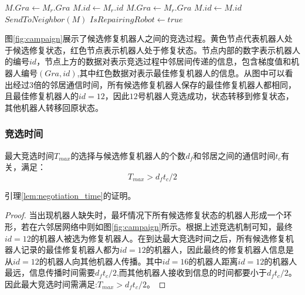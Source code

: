 \begin{algorithm}
	\begin{algorithmic}[1]
					\State $M.Gra \gets M_r.Gra$
					\State $M.id \gets M_r.id$	
				\Else 
						\State $M.Gra \gets M_r.Gra$
						\State $M.id \gets M.id$
					\EndIf
				\EndIf
				\State $SendToNeighbor(M)$
			\Else 
					\State $IsRepairingRobot \gets true$
					\State {} 
				\EndIf	
			\EndIf			
		\EndFunction		
	\end{algorithmic}
\end{algorithm}

图\ref{fig:campaign}展示了候选修复机器人之间的竞选过程。黄色节点代表机器人处于候选修复状态，红色节点表示机器人处于修复状态。节点内部的数字表示机器人的编号$id$，节点上方的数据对表示竞选过程中邻居间传递的信息，包含梯度值和机器人编号$(Gra,id)$,其中红色数据对表示最佳修复机器人的信息。从图中可以看出经过3倍的邻居通信时间，所有候选修复机器人保存的最佳修复机器人都相同，且最佳修复机器人的$id = 12$，因此$12$号机器人竞选成功，状态转移到修复状态，其他机器人转移回原状态。
\begin{figure*}[!htbp]
	\centering
\end{figure*}

\subsubsection{竞选时间}
\begin{lem}
	\label{lem:negotiation_time}
	最大竞选时间$T_{max}$的选择与候选修复机器人的个数$d_f$和邻居之间的通信时间$t_c$有关，满足：\\
	\[
		T_{max} > d_f t_c/2
	\]
	
	引理\ref{lem:negotiation_time}的证明。
	
	\begin{proof}
		当出现机器人缺失时，最坏情况下所有候选修复状态的机器人形成一个环形，若在六邻居网络中则如图\ref{fig:campaign}所示。根据上述竞选机制可知，最终$id=12$的机器人被选为修复机器人。在到达最大竞选时间之后，所有候选修复机器人记录的最佳修复机器人都为$id=12$的机器人，因此最终的修复机器人信息是从$id=12$的机器人向其他机器人传播。其中$id=16$的机器人距离$id=12$的机器人最远，信息传播时间需要$d_f t_c/2$,而其他机器人接收到信息的时间都要小于$d_f t_c/2$。因此最大竞选时间需满足:$T_{max} > d_f t_c/2$。
	\end{proof}
\end{lem}

